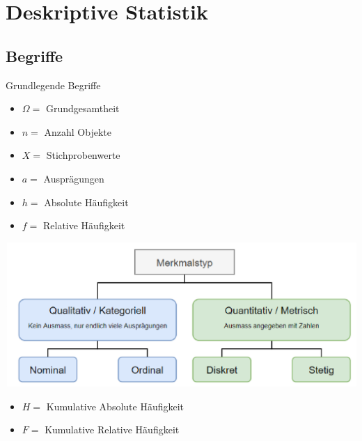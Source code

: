 \section{Deskriptive Statistik}

\subsection{Begriffe}

\begin{concept}{Grundlegende Begriffe}

\begin{minipage}{0.4\linewidth}
\begin{itemize}
    \item $\Omega =$ Grundgesamtheit
    \item $n =$ Anzahl Objekte
    \item $X =$ Stichprobenwerte
    \item $a =$ Ausprägungen
    \item $h =$ Absolute Häufigkeit
    \item $f =$ Relative Häufigkeit
\end{itemize}
\end{minipage}
\begin{minipage}{0.6\linewidth}
    \vspace{-6mm}
    \includegraphics[width=\linewidth]{images/merkmalstypen.png}
\end{minipage}

\begin{itemize}
    \item $H =$ Kumulative Absolute Häufigkeit
    \item $F =$ Kumulative Relative Häufigkeit
\end{itemize}
\end{concept}

